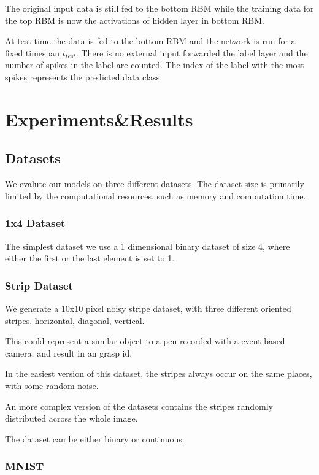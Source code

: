 The original input data is still fed to the bottom RBM while the training data for the top RBM is now the activations of hidden layer in bottom RBM.


At test time the data is fed to the bottom RBM and the network is run for a fixed timespan $t_{test}$.
There is no external input forwarded the label layer and the number of spikes in the label are counted.
The index of the label with the most spikes represents the predicted data class.  


\chapter{Experiments\&Results}

\section{Datasets}

We evalute our models on three different datasets.
The dataset size is primarily limited by the computational resources, such as memory and computation time. 

\subsection{1x4 Dataset}

The simplest dataset we use a 1 dimensional binary dataset of size 4, where either the first or the last element is set to 1. 

\subsection{Strip Dataset}

We generate a 10x10 pixel noisy stripe dataset, with three different oriented stripes, horizontal, diagonal, vertical. 

This could represent a similar object to a pen recorded with a event-based camera, and result in an grasp id.

In the easiest version of this dataset, the stripes always occur on the same places, with some random noise.

An more complex version of the datasets contains the stripes randomly distributed across the whole image.

The dataset can be either binary or continuous.

\subsection{MNIST}

